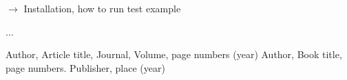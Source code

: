 $\to$ Installation, how to run test example

\medskip
...



\begin{thebibliography}{}
%
%
Author, Article title, Journal, Volume, page numbers (year)
Author, Book title, page numbers. Publisher, place (year)
\end{thebibliography}



